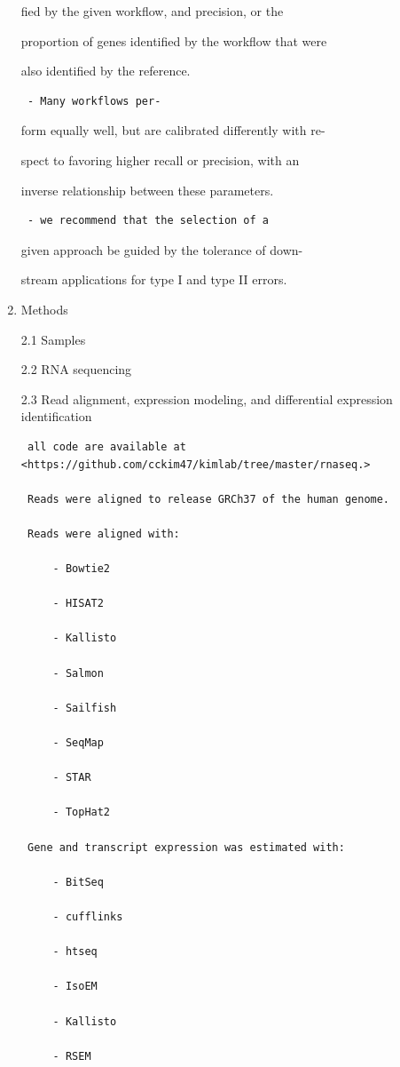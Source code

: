 \documentclass[
]{book}
\begin{document}
\begin{enumerate}
  fied by the given workflow, and precision, or the

  proportion of genes identified by the workflow that were

  also identified by the reference.

\begin{verbatim}
 - Many workflows per-
\end{verbatim}

  form equally well, but are calibrated differently with re-

  spect to favoring higher recall or precision, with an

  inverse relationship between these parameters.

\begin{verbatim}
 - we recommend that the selection of a
\end{verbatim}

  given approach be guided by the tolerance of down-

  stream applications for type I and type II errors.
\item
  Methods

  2.1 Samples

  2.2 RNA sequencing

  2.3 Read alignment, expression modeling, and differential expression identification

\begin{verbatim}
 all code are available at <https://github.com/cckim47/kimlab/tree/master/rnaseq.>

 Reads were aligned to release GRCh37 of the human genome.

 Reads were aligned with:

     - Bowtie2

     - HISAT2

     - Kallisto

     - Salmon

     - Sailfish

     - SeqMap

     - STAR

     - TopHat2

 Gene and transcript expression was estimated with:

     - BitSeq

     - cufflinks

     - htseq

     - IsoEM

     - Kallisto

     - RSEM


\end{verbatim}
\end{enumerate}
\end{document}
